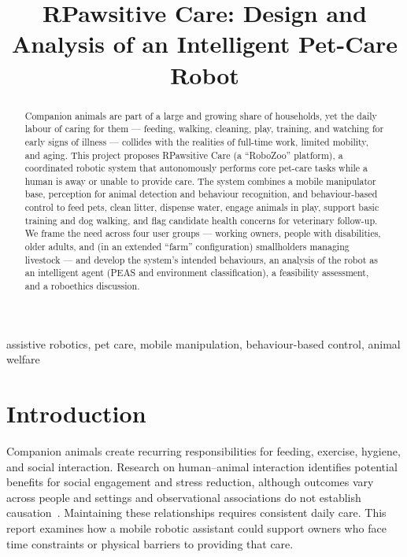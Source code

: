 \documentclass[conference,letterpaper]{IEEEtran}
\begin{document}
\title{RPawsitive Care: Design and Analysis of an Intelligent Pet-Care Robot}
\author{
}
\maketitle
\begin{abstract}

Companion animals are part of a large and growing share of households, yet the daily labour of caring for them — feeding, walking, cleaning, play, training, and watching for early signs of illness — collides with the realities of full-time work, limited mobility, and aging. This project proposes RPawsitive Care (a “RoboZoo” platform), a coordinated robotic system that autonomously performs core pet-care tasks while a human is away or unable to provide care. The system combines a mobile manipulator base, perception for animal detection and behaviour recognition, and behaviour-based control to feed pets, clean litter, dispense water, engage animals in play, support basic training and dog walking, and flag candidate health concerns for veterinary follow-up. We frame the need across four user groups — working owners, people with disabilities, older adults, and (in an extended “farm” configuration) smallholders managing livestock — and develop the system’s intended behaviours, an analysis of the robot as an intelligent agent (PEAS and environment classification), a feasibility assessment, and a roboethics discussion.

\end{abstract}

\begin{IEEEkeywords}assistive robotics, pet care, mobile manipulation, behaviour-based control, animal welfare\end{IEEEkeywords}

\section{Introduction}

Companion animals create recurring responsibilities for feeding, exercise, hygiene, and social interaction. Research on human--animal interaction identifies potential benefits for social engagement and stress reduction, although outcomes vary across people and settings and observational associations do not establish causation~\cite{beetz}. Maintaining these relationships requires consistent daily care. This report examines how a mobile robotic assistant could support owners who face time constraints or physical barriers to providing that care.
\end{document}
